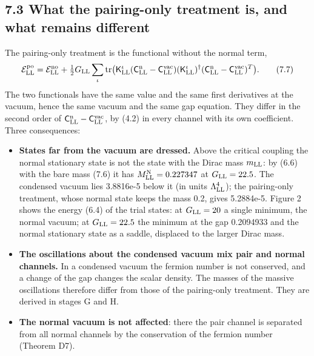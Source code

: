 \documentclass[
  10pt,
]{article}
\providecommand{\tightlist}{%
  \setlength{\itemsep}{0pt}\setlength{\parskip}{0pt}}
\begin{document}
\hypertarget{what-the-pairing-only-treatment-is-and-what-remains-different}{%
\subsection{7.3 What the pairing-only treatment is, and what remains
different}\label{what-the-pairing-only-treatment-is-and-what-remains-different}}

The pairing-only treatment is the functional without the normal term,
\[\mathcal E^{\rm po}_{\rm LL}=\mathcal E^{\rm no}_{\rm LL}+\tfrac12G_{\rm LL}\sum_\iota\mathrm{tr}\big(\mathsf K^\iota_{\rm LL}(\mathsf C^{\rm n}_{\rm LL}-\mathsf C^{\rm vac}_{\rm LL})(\mathsf K^\iota_{\rm LL})^\dagger(\mathsf C^{\rm n}_{\rm LL}-\mathsf C^{\rm vac}_{\rm LL})^T\big).\tag{7.7}\]
The two functionals have the same value and the same first derivatives
at the vacuum, hence the same vacuum and the same gap equation. They
differ in the second order of
\(\mathsf C^{\rm n}_{\rm LL}-\mathsf C^{\rm vac}_{\rm LL}\), by (4.2) in
every channel with its own coefficient. Three consequences:

\begin{itemize}
\tightlist
\item
  \textbf{States far from the vacuum are dressed.} Above the critical
  coupling the normal stationary state is not the state with the Dirac
  mass \(m_{\rm LL}\): by (6.6) with the bare mass (7.6) it has
  \(M^{\rm N}_{\rm LL}=0.227347\) at \(G_{\rm LL}=22.5\). The condensed
  vacuum lies 3.8816e-5 below it (in units \(\Lambda_{\rm LL}^4\)); the
  pairing-only treatment, whose normal state keeps the mass 0.2, gives
  5.2884e-5. Figure 2 shows the energy (6.4) of the trial states: at
  \(G_{\rm LL}=20\) a single minimum, the normal vacuum; at
  \(G_{\rm LL}=22.5\) the minimum at the gap 0.2094933 and the normal
  stationary state as a saddle, displaced to the larger Dirac mass.
\item
  \textbf{The oscillations about the condensed vacuum mix pair and
  normal channels.} In a condensed vacuum the fermion number is not
  conserved, and a change of the gap changes the scalar density. The
  masses of the massive oscillations therefore differ from those of the
  pairing-only treatment. They are derived in stages G and H.
\item
  \textbf{The normal vacuum is not affected}: there the pair channel is
  separated from all normal channels by the conservation of the fermion
  number (Theorem D7).
\end{itemize}
\end{document}
